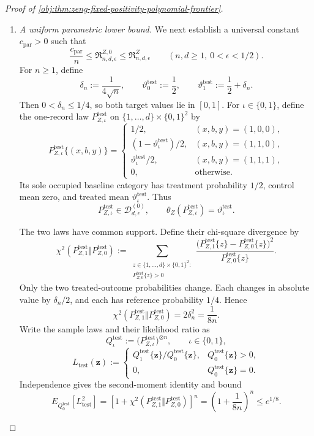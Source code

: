 \begin{proof}[Proof of \cref{obj:thm:zeng-fixed-positivity-polynomial-frontier}]
\begin{enumerate}
\item \textit{A uniform parametric lower bound.}
We next establish a universal constant \(c_{\mathrm{par}}>0\) such that
\[
\frac{c_{\mathrm{par}}}{n}
\le
\mathfrak R^{Z,0}_{n,d,\epsilon}
\le
\mathfrak R^Z_{n,d,\epsilon}
\qquad
(n,d\ge1,\ 0<\epsilon<1/2).
\]
For \(n\ge1\), define
\[
\delta_n:=\frac1{4\sqrt n},
\qquad
\vartheta^{\mathrm{test}}_0:=\frac12,
\qquad
\vartheta^{\mathrm{test}}_1:=\frac12+\delta_n.
\]
Then \(0<\delta_n\le1/4\), so both target values lie in \([0,1]\).
For \(\iota\in\{0,1\}\), define the one-record law
\(P^{\mathrm{test}}_{Z,\iota}\) on
\(\{1,\ldots,d\}\times\{0,1\}^2\) by
\[
P^{\mathrm{test}}_{Z,\iota}\{(x,b,y)\}
=
\begin{cases}
1/2,&(x,b,y)=(1,0,0),\\
(1-\vartheta^{\mathrm{test}}_\iota)/2,
 &(x,b,y)=(1,1,0),\\
\vartheta^{\mathrm{test}}_\iota/2,
 &(x,b,y)=(1,1,1),\\
0,&\text{otherwise}.
\end{cases}
\]
Its sole occupied baseline category has treatment probability \(1/2\),
control mean zero, and treated mean \(\vartheta^{\mathrm{test}}_\iota\).
Thus
\[
P^{\mathrm{test}}_{Z,\iota}\in\mathcal D^{(0)}_{d,\epsilon},
\qquad
\theta_Z(P^{\mathrm{test}}_{Z,\iota})
=\vartheta^{\mathrm{test}}_\iota.
\]

The two laws have common support. Define their chi-square divergence by
\[
\chi^2\!\left(
P^{\mathrm{test}}_{Z,1}\Vert P^{\mathrm{test}}_{Z,0}
\right)
:=
\sum_{\substack{z\in\{1,\ldots,d\}\times\{0,1\}^2:\\
P^{\mathrm{test}}_{Z,0}\{z\}>0}}
\frac{
\bigl(P^{\mathrm{test}}_{Z,1}\{z\}
-P^{\mathrm{test}}_{Z,0}\{z\}\bigr)^2
}{
P^{\mathrm{test}}_{Z,0}\{z\}
}.
\]
Only the two treated-outcome probabilities change. Each changes in
absolute value by \(\delta_n/2\), and each has reference probability
\(1/4\). Hence
\[
\chi^2\!\left(
P^{\mathrm{test}}_{Z,1}\Vert P^{\mathrm{test}}_{Z,0}
\right)
=2\delta_n^2
=\frac1{8n}.
\]
Write the sample laws and their likelihood ratio as
\[
Q^{\mathrm{test}}_\iota
:=
\bigl(P^{\mathrm{test}}_{Z,\iota}\bigr)^{\otimes n},
\qquad \iota\in\{0,1\},
\]
\[
L_{\mathrm{test}}(\mathbf z)
:=
\begin{cases}
Q^{\mathrm{test}}_1\{\mathbf z\}/
Q^{\mathrm{test}}_0\{\mathbf z\},
 &Q^{\mathrm{test}}_0\{\mathbf z\}>0,\\
0,&Q^{\mathrm{test}}_0\{\mathbf z\}=0.
\end{cases}
\]
Independence gives the second-moment identity and bound
\[
E_{Q^{\mathrm{test}}_0}[L_{\mathrm{test}}^2]
=
\left[
1+\chi^2\!\left(
P^{\mathrm{test}}_{Z,1}\Vert P^{\mathrm{test}}_{Z,0}
\right)
\right]^n
=
\left(1+\frac1{8n}\right)^n
\le e^{1/8}.
\]


\end{enumerate}
\end{proof}
